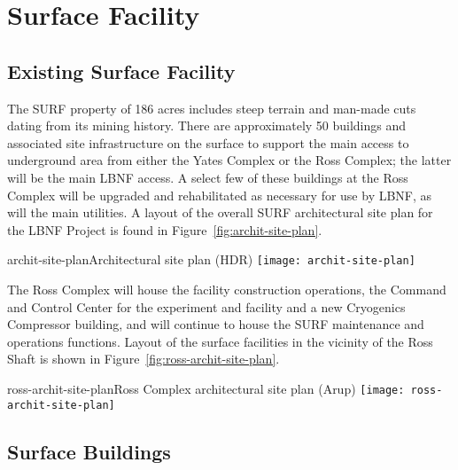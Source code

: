 \chapter{Surface Facility}
\label{ch:fscf-surf-facil}

\section{Existing Surface Facility}
\label{sec:fscf-surf-facil-existing}


The SURF property of 186 acres %
includes steep terrain and man-made cuts dating from its mining history. %
There are approximately 50 buildings and associated site infrastructure on the surface to support the main access to underground area from either the Yates Complex or the Ross Complex; the latter will be the main LBNF access. 
A select few of these buildings at the Ross Complex will be upgraded and rehabilitated as necessary for use by LBNF, as will the main utilities. A layout of the overall SURF architectural site plan for the LBNF Project is found in Figure~\ref{fig:archit-site-plan}.
\begin{cdrfigure}{archit-site-plan}{Architectural site plan (HDR) }
\texttt{[image: archit-site-plan]}
\end{cdrfigure}
The Ross Complex will house the facility construction operations, the Command and Control Center for the experiment and facility and a new Cryogenics Compressor building, and will continue to house the SURF maintenance and operations functions. Layout of the surface facilities in the vicinity of the Ross Shaft is shown in Figure~\ref{fig:ross-archit-site-plan}.

\begin{cdrfigure}{ross-archit-site-plan}{Ross Complex architectural site plan (Arup)}
\texttt{[image: ross-archit-site-plan]}
\end{cdrfigure}

\section{Surface Buildings}
\label{sec:fscf-surf-facil-surface-bldg}


